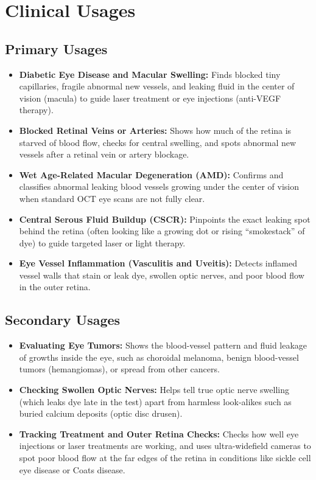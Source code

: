 \section{Clinical Usages}

\subsection{Primary Usages}

\begin{itemize}
    \item \textbf{Diabetic Eye Disease and Macular Swelling:} Finds blocked tiny capillaries, fragile abnormal new vessels, and leaking fluid in the center of vision (macula) to guide laser treatment or eye injections (anti-VEGF therapy).
    \item \textbf{Blocked Retinal Veins or Arteries:} Shows how much of the retina is starved of blood flow, checks for central swelling, and spots abnormal new vessels after a retinal vein or artery blockage.
    \item \textbf{Wet Age-Related Macular Degeneration (AMD):} Confirms and classifies abnormal leaking blood vessels growing under the center of vision when standard OCT eye scans are not fully clear.
    \item \textbf{Central Serous Fluid Buildup (CSCR):} Pinpoints the exact leaking spot behind the retina (often looking like a growing dot or rising ``smokestack'' of dye) to guide targeted laser or light therapy.
    \item \textbf{Eye Vessel Inflammation (Vasculitis and Uveitis):} Detects inflamed vessel walls that stain or leak dye, swollen optic nerves, and poor blood flow in the outer retina.
\end{itemize}

\subsection{Secondary Usages}

\begin{itemize}
    \item \textbf{Evaluating Eye Tumors:} Shows the blood-vessel pattern and fluid leakage of growths inside the eye, such as choroidal melanoma, benign blood-vessel tumors (hemangiomas), or spread from other cancers.
    \item \textbf{Checking Swollen Optic Nerves:} Helps tell true optic nerve swelling (which leaks dye late in the test) apart from harmless look-alikes such as buried calcium deposits (optic disc drusen).
    \item \textbf{Tracking Treatment and Outer Retina Checks:} Checks how well eye injections or laser treatments are working, and uses ultra-widefield cameras to spot poor blood flow at the far edges of the retina in conditions like sickle cell eye disease or Coats disease.
\end{itemize}

